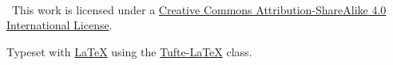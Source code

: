 \documentclass[a4paper,oneside,marginals=justified,nobib]{tufte-book}
\newcommand{\monthyear}{\ifcase\month\or January\or February\or March\or 
April\or May\or June\or July\or August\or September\or October\or 
November\or December\fi\space\number\year} %
\begin{document}

\newpage
~\vfill
\thispagestyle{empty}
\setlength{\parindent}{0pt}
\setlength{\parskip}{\baselineskip}

\ccbysa\ This work is licensed under a 
\href{http://creativecommons.org/licenses/by-sa/4.0/}
{Creative Commons Attribution-ShareAlike 4.0 International License}.

\par Typeset with \href{ttps://www.latex-project.org/}{\LaTeX} using the 
\href{https://tufte-latex.github.io/tufte-latex/}{Tufte-LaTeX} class.



\renewcommand{\baselinestretch}{0.75}\normalsize
\tableofcontents %
\listoffigures %
\listoftables %
\listoftodos
\renewcommand{\baselinestretch}{1.0}\normalsize

\end{document}
